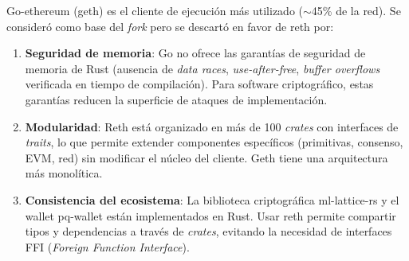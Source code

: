 Go-ethereum (geth) es el cliente de ejecución más utilizado ($\sim$45\% de la red). Se consideró como base del \emph{fork} pero se descartó en favor de reth por:

\begin{enumerate}
  \item \textbf{Seguridad de memoria}: Go no ofrece las garantías de seguridad de memoria de Rust (ausencia de \emph{data races}, \emph{use-after-free}, \emph{buffer overflows} verificada en tiempo de compilación). Para software criptográfico, estas garantías reducen la superficie de ataques de implementación.
  
  \item \textbf{Modularidad}: Reth está organizado en más de 100 \emph{crates} con interfaces de \emph{traits}, lo que permite extender componentes específicos (primitivas, consenso, EVM, red) sin modificar el núcleo del cliente. Geth tiene una arquitectura más monolítica.
  
  \item \textbf{Consistencia del ecosistema}: La biblioteca criptográfica ml-lattice-rs y el wallet pq-wallet están implementados en Rust. Usar reth permite compartir tipos y dependencias a través de \emph{crates}, evitando la necesidad de interfaces FFI (\emph{Foreign Function Interface}).
\end{enumerate}

